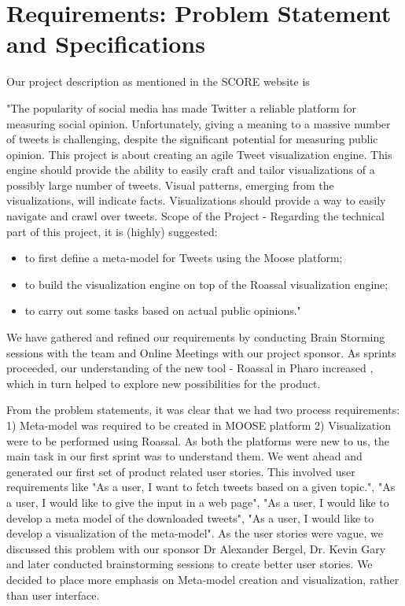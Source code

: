 \documentclass[11pt]{article}
\begin{document}
\section{Requirements: Problem Statement and Specifications}
Our project description as mentioned in the SCORE website is 

"The popularity of social media has made Twitter a reliable platform for measuring social opinion. Unfortunately, giving a meaning to a massive number of tweets is challenging, despite the significant potential for measuring public opinion. This project is about creating an agile Tweet visualization engine. This engine should provide the ability to easily craft and tailor visualizations of a possibly large number of tweets. Visual patterns, emerging from the visualizations, will indicate facts. Visualizations should provide a way to easily navigate and crawl over tweets. Scope of the Project - Regarding the technical part of this project, it is (highly) suggested:
\begin{itemize}
\item to first define a meta-model for Tweets using the Moose platform;
\item to build the visualization engine on top of the Roassal visualization engine;
\item to carry out some tasks based on actual public opinions." \cite{SCOREwebsite}
\end{itemize}

We have gathered and refined our requirements by conducting Brain Storming sessions with the team and Online Meetings with our project sponsor. As sprints proceeded, our understanding of the new tool - Roassal in Pharo increased , which in turn helped to explore new possibilities for the product. 

From the problem statements, it was clear that we had two process requirements: 1) Meta-model was required to be created in MOOSE platform 2) Visualization were to be performed using Roassal. As both the platforms were new to us, the main task in our first sprint was to understand them. We went ahead and generated our first set of product related user stories. This involved user requirements like "As a user, I want to fetch tweets based on a given topic.", "As a user, I would like to give the input in a web page", "As a user, I would like to develop a meta model of the downloaded tweets", "As a user, I would like to develop a visualization of the meta-model". As the user stories were vague, we discussed this problem with our sponsor Dr Alexander Bergel, Dr. Kevin Gary and later conducted brainstorming sessions to create better user stories. We decided to place more emphasis on Meta-model creation and visualization, rather than user interface. 
\end{document}
